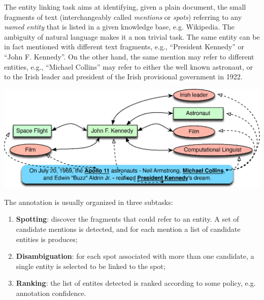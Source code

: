 \documentclass[a0,portrait,final]{a0poster}
\newcommand{\pbox}[3]{
	\begin{center}
	\psshadowbox[linewidth=2mm,framearc=0.1,framesep=1em,shadowsize=4mm,shadowcolor=lightgray,linecolor=#2]{
		\begin{minipage}[t][][t]{#1}{
			#3 %
		}\end{minipage}
	}
	\end{center}
}
\newlength\ptitlespace
\newcommand{\ptitle}[1]{
	\vspace{\ptitlespace}
	\pbox{0.92\columnwidth}{arancioneisti}{
		\begin{center}
		\textsc{\LARGE\bluisti{#1}} %
		\end{center}
	}
	\vspace{0.5\ptitlespace}
}
\begin{document}
\vfill
\large


\begin{multicols}{2}

\ptitle{Entity Linking Problem}

The entity linking task aims at identifying, given a plain document, the small fragments of text (interchangeably called \emph{mentions} or \emph{spots}) referring to any \emph{named entity} that is listed in a given knowledge base, e.g. Wikipedia. The ambiguity of natural language makes it a non trivial task. The same entity can be in fact mentioned with different text fragments, e.g., ``President Kennedy'' or ``John F. Kennedy''. On the other hand, the same mention may refer to different entities, e.g., ``Michael Collins'' may refer to either the well known astronaut, or to the Irish leader and president of the Irish provisional government in 1922.

\vspace{5mm}
\begin{center}
\includegraphics[width=0.92\columnwidth]{img/annotation-example.eps}
\end{center}

The annotation is usually organized in three subtasks:
\begin{enumerate}
	\item \textbf{Spotting}: discover the fragments that could refer to an entity. A set of candidate mentions is detected, and for each mention a list of candidate entities is produces;
	\item \textbf{Disambiguation}: for each spot associated with more than one candidate, a single entity is selected to be linked to the spot;
	\item \textbf{Ranking}: the list of entites detected is ranked according to some policy, e.g. annotation confidence. 
\end{enumerate}



\end{multicols}
\end{document}
